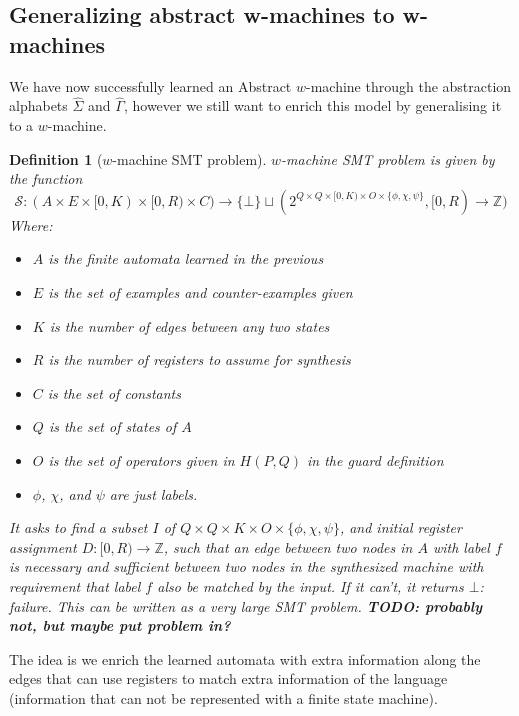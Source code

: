 \documentclass{article}
\newtheorem{definition}{Definition}
\begin{document}
\subsection{Generalizing abstract w-machines to w-machines}
We have now successfully learned an Abstract $w$-machine through the abstraction alphabets $\hat\Sigma$ and $\hat\Gamma$, however we still want to enrich this model by generalising it to a $w$-machine.

\begin{definition}[$w$-machine SMT problem]
$w$-machine SMT problem is given by the function 
$$\mathcal{S} : (A \times E \times [0, K) \times [0, R) \times C) \to \{\bot\} \sqcup (2^{Q \times Q \times [0, K) \times O \times \{\phi, \chi, \psi\}}, [0, R) \to \mathbb{Z})$$
Where:
\begin{itemize}
    \item $A$ is the finite automata learned in the previous
    \item $E$ is the set of examples and counter-examples given
    \item $K$ is the number of edges between any two states
    \item $R$ is the number of registers to assume for synthesis
    \item $C$ is the set of constants
    \item $Q$ is the set of states of $A$
    \item $O$ is the set of operators given in $H(P,Q)$ in the guard definition
    \item $\phi$, $\chi$, and $\psi$ are just labels.
\end{itemize}
It asks to find a subset $I$ of $Q \times Q \times K \times O \times \{\phi, \chi, \psi\}$,
and initial register assignment $D: [0, R) \to \mathbb{Z}$,
such that an edge between two nodes in $A$ with label $f$
is necessary and sufficient between two nodes in the synthesized machine with requirement that label $f$ also be matched by the input. 
If it can't, it returns $\bot$: failure.
This can be written as a very large SMT problem.
\textbf{TODO: probably not, but maybe put problem in?}
\end{definition}

The idea is we enrich the learned automata with extra information along the edges that can use registers to match extra information of the language (information that can not be represented with a finite state machine).
\end{document}
